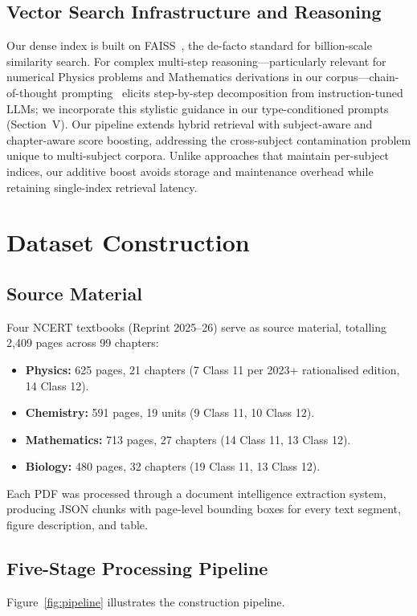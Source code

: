 \documentclass[conference]{IEEEtran}
\begin{document}
\subsection{Vector Search Infrastructure and Reasoning}
Our dense index is built on FAISS~\cite{johnson2021faiss}, the de-facto standard for billion-scale similarity search. For complex multi-step reasoning---particularly relevant for numerical Physics problems and Mathematics derivations in our corpus---chain-of-thought prompting~\cite{wei2022cot} elicits step-by-step decomposition from instruction-tuned LLMs; we incorporate this stylistic guidance in our type-conditioned prompts (Section~V). Our pipeline extends hybrid retrieval with subject-aware and chapter-aware score boosting, addressing the cross-subject contamination problem unique to multi-subject corpora. Unlike approaches that maintain per-subject indices, our additive boost avoids storage and maintenance overhead while retaining single-index retrieval latency.

\section{Dataset Construction}

\subsection{Source Material}
Four NCERT textbooks (Reprint 2025--26) serve as source material, totalling 2{,}409 pages across 99 chapters:
\begin{itemize}
    \item \textbf{Physics:} 625 pages, 21 chapters (7 Class 11 per 2023+ rationalised edition, 14 Class 12).
    \item \textbf{Chemistry:} 591 pages, 19 units (9 Class 11, 10 Class 12).
    \item \textbf{Mathematics:} 713 pages, 27 chapters (14 Class 11, 13 Class 12).
    \item \textbf{Biology:} 480 pages, 32 chapters (19 Class 11, 13 Class 12).
\end{itemize}
Each PDF was processed through a document intelligence extraction system, producing JSON chunks with page-level bounding boxes for every text segment, figure description, and table.

\subsection{Five-Stage Processing Pipeline}
Figure~\ref{fig:pipeline} illustrates the construction pipeline.
\end{document}
